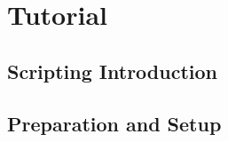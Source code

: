 \documentclass[
  openany]{book}
\begin{document}
\hypertarget{tutorial-3}{%
\section*{Tutorial}\label{tutorial-3}}

\hypertarget{scripting-introduction}{%
\subsection*{Scripting Introduction}\label{scripting-introduction}}

\hypertarget{preparation-and-setup}{%
\subsection*{Preparation and Setup}\label{preparation-and-setup}}
\end{document}
